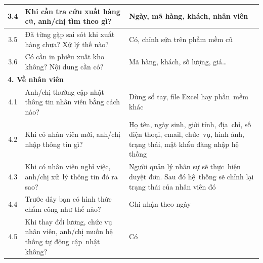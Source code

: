 \documentclass[a4paper,12pt]{report}
\begin{document}
\begin{longtable}{|c|p{8cm}|p{7cm}|}
    \hline
    3.4          & Khi cần tra cứu xuất hàng cũ, anh/chị tìm theo gì?                                                                      & Ngày, mã hàng, khách, nhân viên                                                                                         \\
    \hline
    3.5          & Đã từng gặp sai sót khi xuất hàng chưa? Xử lý thế nào?                                                                  & Có, chỉnh sửa trên phầm mềm cũ                                                                                          \\
    \hline
    3.6          & Có cần in phiếu xuất kho không? Nội dung cần có?                                                                        & Mã hàng, khách, số lượng, giá…                                                                                          \\
    \hline
    \multicolumn{3}{|l|}{\textbf{4. Về nhân viên}}                                                                                                                                                                                                                    \\
    \hline
    4.1          & Anh/chị thường cập nhật thông tin nhân viên bằng cách nào?                                                              & Dùng sổ tay, file Excel hay phần~mềm khác                                                                                \\
    \hline
    4.2          & Khi có nhân viên mới, anh/chị nhập thông tin gì?                                                                        & Họ tên, ngày sinh, giới tính, địa~chỉ, số điện thoại, email, chức~vụ, hình ảnh, trạng thái, mật khẩu đăng nhập hệ thống \\
    \hline
    4.3          & Khi có nhân viên nghỉ việc, anh/chị xử~lý thông tin đó ra sao?                                                          & Người quản lý nhân sự sẽ thực~hiện duyệt đơn. Sau đó hệ~thống sẽ chỉnh lại trạng thái của nhân viên đó                  \\
    \hline
    4.4          & Trước đây bạn có hình thức chấm công như thế nào?                                                                       & Ghi nhận theo ngày                                                                                                       \\
    \hline
    4.5          & Khi thay đổi lương, chức vụ nhân viên, anh/chị muốn hệ thống tự động cập~nhật không?                                    & Có                                                                                                                       \\

\end{longtable}
\end{document}
